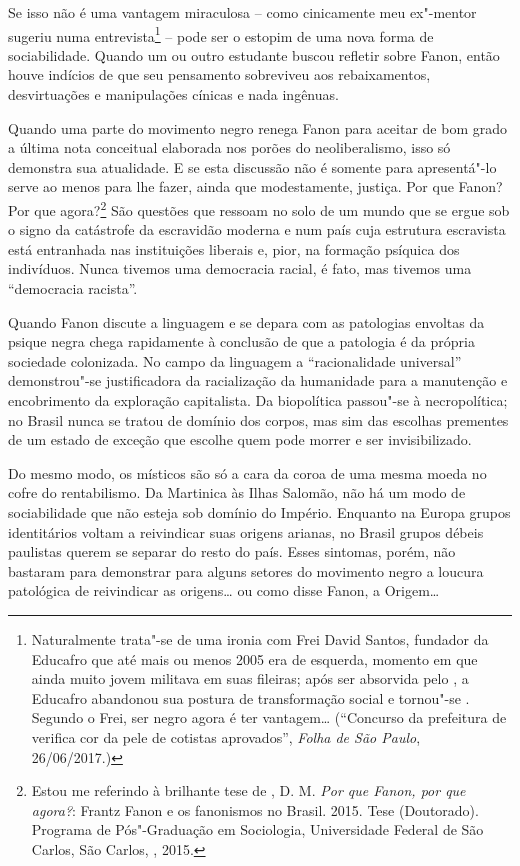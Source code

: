 Se isso não é uma vantagem miraculosa -- como cinicamente meu ex"-mentor
sugeriu numa entrevista\footnote{Naturalmente trata"-se de uma ironia com
  Frei David Santos, fundador da Educafro que até mais ou menos 2005 era
  de esquerda, momento em que ainda muito jovem militava em suas
  fileiras; após ser absorvida pelo , a Educafro abandonou sua postura
  de transformação social e tornou"-se . Segundo o Frei, ser negro
  agora é ter vantagem\ldots{} (``Concurso da prefeitura de  verifica cor da
      pele de cotistas aprovados'', \emph{Folha de São Paulo}, 26/06/2017.)}
-- pode ser o estopim de uma nova forma de sociabilidade. Quando um ou
outro estudante buscou refletir sobre Fanon, então houve indícios de que
seu pensamento sobreviveu aos rebaixamentos, desvirtuações e
manipulações cínicas e nada ingênuas.

Quando uma parte do movimento negro renega Fanon para aceitar de bom
grado a última nota conceitual elaborada nos porões do neoliberalismo,
isso só demonstra sua atualidade. E se esta discussão não é somente para
apresentá"-lo serve ao menos para lhe fazer, ainda que modestamente,
justiça. Por que Fanon? Por que agora?\footnote{Estou me referindo à
  brilhante tese de , D. M. \emph{Por que Fanon, por que
  agora?}: Frantz Fanon e os fanonismos no Brasil. 2015. Tese
  (Doutorado). Programa de Pós"-Graduação em Sociologia, Universidade
  Federal de São Carlos, São Carlos, , 2015.} São questões que ressoam
no solo de um mundo que se ergue sob o signo da catástrofe da escravidão
moderna e num país cuja estrutura escravista está entranhada nas
instituições liberais e, pior, na formação psíquica dos indivíduos.
Nunca tivemos uma democracia racial, é fato, mas tivemos uma
``democracia racista''.

Quando Fanon discute a linguagem e se depara com as patologias envoltas
da psique negra chega rapidamente à conclusão de que a patologia é da
própria sociedade colonizada. No campo da linguagem a ``racionalidade
universal'' demonstrou"-se justificadora da racialização da humanidade
para a manutenção e encobrimento da exploração capitalista. Da
biopolítica passou"-se à necropolítica; no Brasil nunca se tratou de
domínio dos corpos, mas sim das escolhas prementes de um estado de
exceção que escolhe quem pode morrer e ser invisibilizado.

Do mesmo modo, os místicos são só a cara da coroa de uma mesma moeda no
cofre do rentabilismo. Da Martinica às Ilhas Salomão, não há um modo de
sociabilidade que não esteja sob domínio do Império. Enquanto na Europa
grupos identitários voltam a reivindicar suas origens arianas, no Brasil
grupos débeis paulistas querem se separar do resto do país. Esses
sintomas, porém, não bastaram para demonstrar para alguns setores do
movimento negro a loucura patológica de reivindicar as origens\ldots{} ou
como disse Fanon, a Origem\ldots{}

